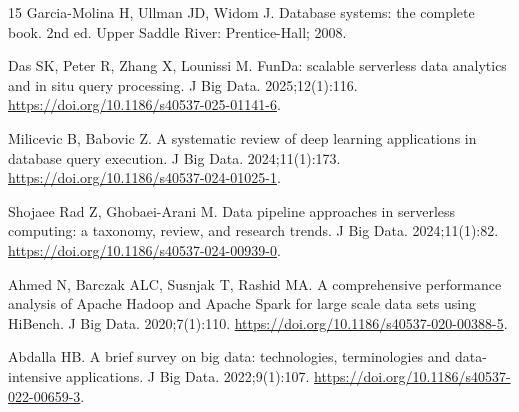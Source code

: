 \documentclass[10pt,a4paper]{article}
\begin{document}
\begin{thebibliography}{15}
Garcia-Molina H, Ullman JD, Widom J. Database systems: the complete book. 2nd ed. Upper Saddle River: Prentice-Hall; 2008.

Das SK, Peter R, Zhang X, Lounissi M. FunDa: scalable serverless data analytics and in situ query processing. J Big Data. 2025;12(1):116. \url{https://doi.org/10.1186/s40537-025-01141-6}.

Milicevic B, Babovic Z. A systematic review of deep learning applications in database query execution. J Big Data. 2024;11(1):173. \url{https://doi.org/10.1186/s40537-024-01025-1}.

Shojaee Rad Z, Ghobaei-Arani M. Data pipeline approaches in serverless computing: a taxonomy, review, and research trends. J Big Data. 2024;11(1):82. \url{https://doi.org/10.1186/s40537-024-00939-0}.

Ahmed N, Barczak ALC, Susnjak T, Rashid MA. A comprehensive performance analysis of Apache Hadoop and Apache Spark for large scale data sets using HiBench. J Big Data. 2020;7(1):110. \url{https://doi.org/10.1186/s40537-020-00388-5}.

Abdalla HB. A brief survey on big data: technologies, terminologies and data-intensive applications. J Big Data. 2022;9(1):107. \url{https://doi.org/10.1186/s40537-022-00659-3}.

\end{thebibliography}
\end{document}
